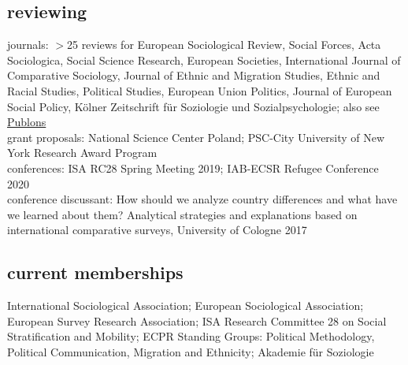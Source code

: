 \documentclass[11pt, a4paper]{article}
\begin{document}
\subsection*{reviewing}
journals: $>$25 reviews for European Sociological Review, Social Forces, Acta Sociologica, Social Science Research, European Societies, International Journal of Comparative Sociology, Journal of Ethnic and Migration Studies, Ethnic and Racial Studies, Political Studies, European Union Politics, Journal of European Social Policy, K\"olner Zeitschrift f\"ur Soziologie und Sozialpsychologie; also see \href{https://publons.com/researcher/3006411/christian-s-czymara/}{Publons}\\

grant proposals: National Science Center Poland; PSC-City University of New York Research Award Program\\

conferences: ISA RC28 Spring Meeting 2019; IAB-ECSR Refugee Conference 2020\\

conference discussant: How should we analyze country differences and what have we learned about them? Analytical strategies and explanations based on international comparative surveys, University of Cologne 2017\\
\subsection*{current memberships}
International Sociological Association; European Sociological Association; European Survey Research Association; ISA Research Committee 28 on Social Stratification and Mobility; ECPR Standing Groups: Political Methodology, Political Communication, Migration and Ethnicity; Akademie für Soziologie\\
\end{document}
